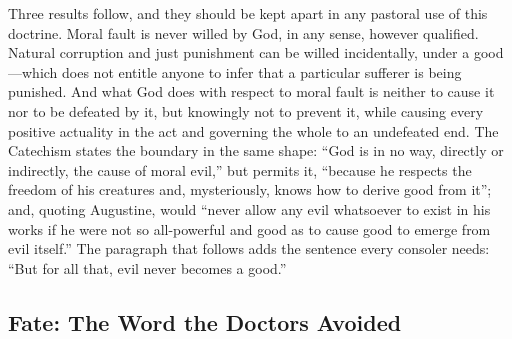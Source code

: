 Three results follow, and they should be kept apart in any pastoral use of this doctrine. Moral fault is never willed by God, in any sense, however qualified. Natural corruption and just punishment can be willed incidentally, under a good---which does not entitle anyone to infer that a particular sufferer is being punished. And what God does with respect to moral fault is neither to cause it nor to be defeated by it, but knowingly not to prevent it, while causing every positive actuality in the act and governing the whole to an undefeated end. The Catechism states the boundary in the same shape: ``God is in no way, directly or indirectly, the cause of moral evil,'' but permits it, ``because he respects the freedom of his creatures and, mysteriously, knows how to derive good from it''; and, quoting Augustine, would ``never allow any evil whatsoever to exist in his works if he were not so all-powerful and good as to cause good to emerge from evil itself.'' The paragraph that follows adds the sentence every consoler needs: ``But for all that, evil never becomes a good.''

\subsection{Fate: The Word the Doctors Avoided}

